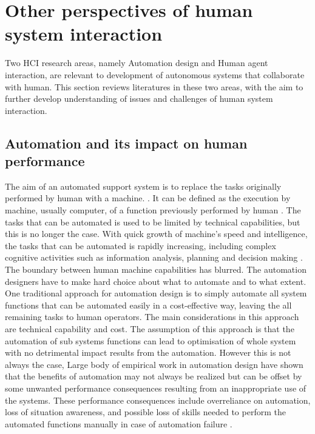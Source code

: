 


\section{Other perspectives of human system interaction}
Two HCI research areas, namely Automation design and Human agent interaction, are relevant to development of autonomous systems that collaborate with human. This section reviews literatures in these two areas, with the aim to further develop understanding of issues and challenges of human system interaction. \\


\subsection{Automation and its impact on human performance}
The aim of an automated support system is to replace the tasks originally performed by human with a machine. \cite{Bradshaw2011} . It can be defined as the execution by machine, usually computer, of a function previously performed by human \cite{Parasuraman1997}. The tasks that can be automated is used to be limited by technical capabilities, but this is no longer the case. With quick growth of machine's speed and intelligence, the tasks that can be automated is rapidly increasing, including complex cognitive activities such as information analysis, planning and decision making \cite{Parasuraman2000}. The boundary between human machine capabilities has blurred. The automation designers have to make hard choice about what to automate and to what extent.\\

One traditional approach for automation design is to simply automate all system functions that can be automated easily in a cost-effective way, leaving the all remaining tasks to human operators. The main considerations in this approach are technical capability and cost. The assumption of this approach is that the automation of sub systems functions can lead to optimisation of whole system with no detrimental impact results from the automation. However this is not always the case, Large body of empirical work in automation design \cite{Manzey2012,Parasuraman2000} have shown that the benefits of automation may not always be realized but can be offset by some unwanted performance consequences resulting from an inappropriate use of the systems. These performance consequences include overreliance on automation, loss of situation awareness, and possible loss of skills needed to perform the automated functions manually in case of automation failure \cite{Kaber1997}.\\ 

